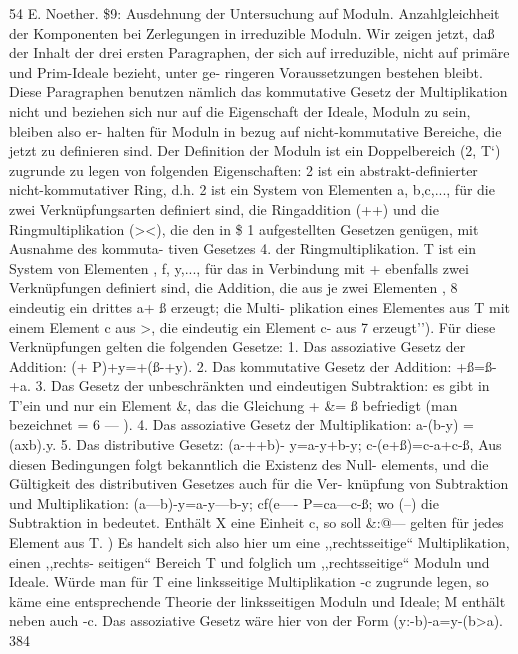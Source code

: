 \documentclass[11pt,a4paper]{article}
\theoremstyle{plain}
\theoremstyle{definition}
\begin{document}
54 
E. Noether. 
\$9: 
Ausdehnung der Untersuchung auf Moduln. 
Anzahlgleichheit der 
Komponenten bei Zerlegungen in irreduzible Moduln. 
Wir zeigen jetzt, daß der Inhalt der drei 
ersten Paragraphen, 
der 
sich auf irreduzible, nicht auf primäre und Prim-Ideale bezieht, unter ge- 
ringeren Voraussetzungen 
bestehen 
bleibt. 
Diese Paragraphen 
benutzen 
nämlich 
das kommutative Gesetz 
der Multiplikation nicht und beziehen 
sich nur auf die Eigenschaft der Ideale, Moduln zu sein, bleiben also er- 
halten für Moduln in bezug auf nicht-kommutative Bereiche, die jetzt zu 
definieren sind. 
Der Definition der Moduln ist ein Doppelbereich (2, T`) 
zugrunde zu legen von folgenden Eigenschaften: 
2 ist ein abstrakt-definierter nicht-kommutativer Ring, d.h. 2 ist 
ein System 
von Elementen 
a, b,c,..., 
für die zwei Verknüpfungsarten 
definiert sind, die Ringaddition (++) und die Ringmultiplikation (><), die 
den in \$ 1 aufgestellten Gesetzen genügen, mit Ausnahme des kommuta- 
tiven Gesetzes 4. der Ringmultiplikation. 
T ist ein System von Elementen \guillemotleft{}, f, y,..., für das in Verbindung 
mit + ebenfalls zwei Verknüpfungen definiert sind, die Addition, die aus 
je zwei Elementen \guillemotleft{}, 8 eindeutig 
ein drittes a+ ß erzeugt; 
die Multi- 
plikation 
eines Elementes 
\guillemotleft{} aus T mit einem Element c aus >, die 
eindeutig ein Element c-\guillemotleft{} aus 7 erzeugt''). 
Für diese Verknüpfungen gelten die folgenden Gesetze: 
1. Das assoziative Gesetz der Addition: (\guillemotleft{}+ P)+y=\guillemotleft{}+(ß-+y). 
2. Das kommutative Gesetz der Addition: 
\guillemotleft{}+ß=ß-+a\guillemotleft{}. 
3. Das Gesetz der unbeschränkten und eindeutigen Subtraktion: 
es gibt 
in T'ein und nur ein Element \&, das die Gleichung \guillemotleft{} + \&= ß befriedigt 
(man bezeichnet 
= 6 --- \guillemotleft{}). 
4. Das assoziative Gesetz der Multiplikation: a-(b-y) = (axb).y. 
5. Das distributive Gesetz: 
(a-++b)- y=a-y+b-y; 
c-(e+ß)=c-a+c-ß, 
Aus diesen Bedingungen 
folgt bekanntlich 
die Existenz 
des Null- 
elements, und die Gültigkeit des distributiven Gesetzes auch für die Ver- 
knüpfung von Subtraktion und Multiplikation: 
(a---b)-y=a-y---b-y; 
cf(e---- P=ca---c-ß; 
wo (--) die Subtraktion in \guillemotright{} bedeutet. 
Enthält X eine Einheit c, so soll 
\&:@---\guillemotleft{} gelten für jedes Element \guillemotleft{} aus T. 
\textdegree{}\textdegree{}) Es handelt sich also hier um eine ,,rechtsseitige`` Multiplikation, einen ,,rechts- 
seitigen`` Bereich T und folglich um ,,rechtsseitige`` Moduln und Ideale. 
Würde man 
für T eine linksseitige Multiplikation \guillemotleft{}-c zugrunde legen, so käme eine entsprechende 
Theorie 
der linksseitigen Moduln und 
Ideale; M enthält neben \guillemotleft{} auch \guillemotleft{}-c. 
Das 
assoziative Gesetz wäre hier von der Form (y:-b)-a=y-(b>a). 
384
\end{document}
